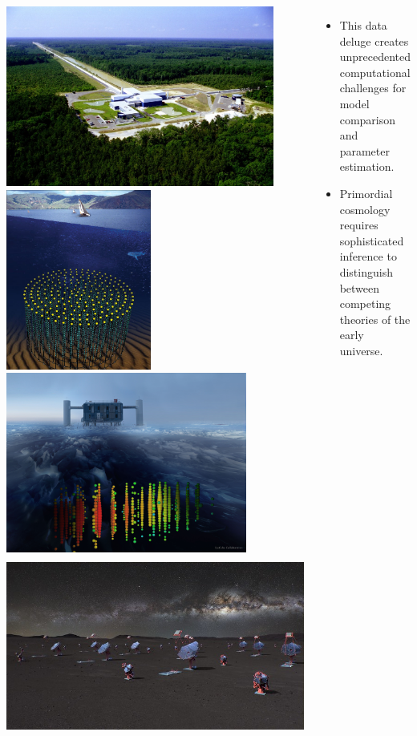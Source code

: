 \documentclass[aspectratio=169]{beamer}
\begin{document}
\begin{frame}
\begin{columns}
        \includegraphics[height=0.18428\textwidth]{figures/telescopes/ligo.jpg}%
        \includegraphics[height=0.18428\textwidth]{figures/telescopes/km3n.jpg}%
        \includegraphics[height=0.18428\textwidth]{figures/telescopes/icecube.jpg}%
        \includegraphics[height=0.18428\textwidth]{figures/telescopes/CTA.jpg}%

        \begin{itemize}
            \item This data deluge creates unprecedented computational challenges for model comparison and parameter estimation.
            \item Primordial cosmology requires sophisticated inference to distinguish between competing theories of the early universe.
        \end{itemize}

    \end{columns}
\end{frame}
\end{document}
